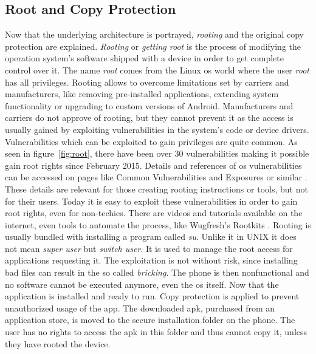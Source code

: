 \subsection{Root and Copy Protection} \label{subsection:android-copyroot}
Now that the underlying architecture is portrayed, \textit{rooting} and the original copy protection are explained.
\textit{Rooting} or \textit{getting root} is the process of modifying the operation system's software shipped with a device in order to get complete control over it.
The name \textit{root} comes from the Linux \gls{os} world where the user \textit{root} has all privileges.
Rooting allows to overcome limitations set by carriers and manufacturers, like removing pre-installed applications, extending system functionality or upgrading to custom versions of Android.
Manufacturers and carriers do not approve of rooting, but they cannot prevent it as the access is usually gained by exploiting vulnerabilities in the system's code or device drivers.
Vulnerabilities which can be exploited to gain privileges are quite common.
As seen in figure~\ref{fig:root}, there have been over 30 vulnerabilities making it possible gain root rights since February 2015.
Details and references of \gls{os} vulnerabilities can be accessed on pages like Common Vulnerabilities and Exposures or similar \cite{cveAndroidPriv} \cite{cveDetails}.
These details are relevant for those creating rooting instructions or tools, but not for their users.
\newline
Today it is easy to exploit these vulnerabilities in order to gain root rights, even for non-techies.
There are videos and tutorials available on the internet, even tools to automate the process, like Wugfresh's Rootkits \cite{wugfresh}.
Rooting is usually bundled with installing a program called \textit{su}.
Unlike it in UNIX it does not mean \textit{super user} but \textit{switch user}.
It is used to manage the root access for applications requesting it.
The exploitation is not without risk, since installing bad files can result in the so called \textit{bricking}.
The phone is then nonfunctional and no software cannot be executed anymore, even the \gls{os} itself.
 \cite{androidpoliceRoot}
\newline
Now that the application is installed and ready to run.
Copy protection is applied to prevent unauthorized usage of the app.
The downloaded \gls{apk}, purchased from an application store, is moved to the secure installation folder on the phone.
The user has no rights to access the \gls{apk} in this folder and thus cannot copy it, unless they have rooted the device.
